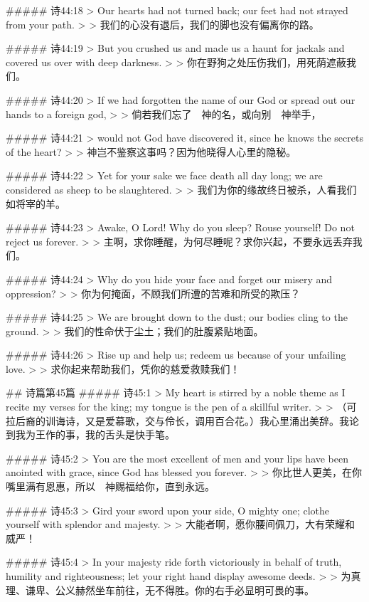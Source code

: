 ##### 诗44:18
> Our hearts had not turned back; our feet had not strayed from your path.
>
> 我们的心没有退后，我们的脚也没有偏离你的路。


##### 诗44:19
> But you crushed us and made us a haunt for jackals and covered us over with deep darkness.
>
> 你在野狗之处压伤我们，用死荫遮蔽我们。


##### 诗44:20
> If we had forgotten the name of our God or spread out our hands to a foreign god,
>
> 倘若我们忘了　神的名，或向别　神举手，


##### 诗44:21
> would not God have discovered it, since he knows the secrets of the heart?
>
> 神岂不鉴察这事吗？因为他晓得人心里的隐秘。


##### 诗44:22
> Yet for your sake we face death all day long; we are considered as sheep to be slaughtered.
>
> 我们为你的缘故终日被杀，人看我们如将宰的羊。


##### 诗44:23
> Awake, O Lord! Why do you sleep? Rouse yourself! Do not reject us forever.
>
> 主啊，求你睡醒，为何尽睡呢？求你兴起，不要永远丢弃我们。


##### 诗44:24
> Why do you hide your face and forget our misery and oppression?
>
> 你为何掩面，不顾我们所遭的苦难和所受的欺压？


##### 诗44:25
> We are brought down to the dust; our bodies cling to the ground.
>
> 我们的性命伏于尘土；我们的肚腹紧贴地面。


##### 诗44:26
> Rise up and help us; redeem us because of your unfailing love.
>
> 求你起来帮助我们，凭你的慈爱救赎我们！


## 诗篇第45篇
##### 诗45:1
> My heart is stirred by a noble theme as I recite my verses for the king; my tongue is the pen of a skillful writer.
>
> （可拉后裔的训诲诗，又是爱慕歌，交与伶长，调用百合花。）我心里涌出美辞。我论到我为王作的事，我的舌头是快手笔。


##### 诗45:2
> You are the most excellent of men and your lips have been anointed with grace, since God has blessed you forever.
>
> 你比世人更美，在你嘴里满有恩惠，所以　神赐福给你，直到永远。


##### 诗45:3
> Gird your sword upon your side, O mighty one; clothe yourself with splendor and majesty.
>
> 大能者啊，愿你腰间佩刀，大有荣耀和威严！


##### 诗45:4
> In your majesty ride forth victoriously in behalf of truth, humility and righteousness; let your right hand display awesome deeds.
>
> 为真理、谦卑、公义赫然坐车前往，无不得胜。你的右手必显明可畏的事。


